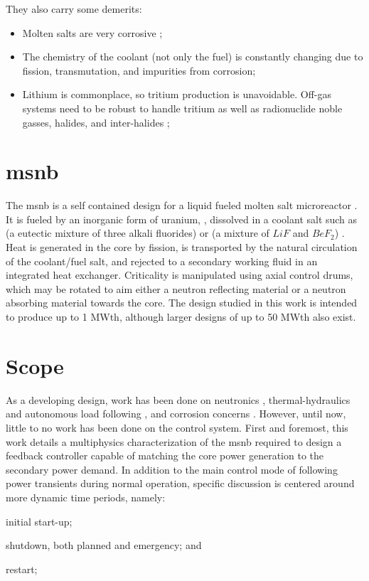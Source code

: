 They also carry some demerits:
\begin{itemize}
    \item Molten salts are very corrosive \cite{RoperRedox};
    \item The chemistry of the coolant (not only the fuel) is constantly changing due to fission, transmutation, and impurities from corrosion;
    \item Lithium is commonplace, so tritium production is unavoidable. Off-gas systems need to be robust to handle tritium as well as radionuclide noble gasses, halides, and inter-halides \cite{HolcombOffgas};
\end{itemize}

\section{\texorpdfstring{\acl{msnb}}{Molten Salt Nuclear Battery}}
The \acf{msnb} is a self contained design for a liquid fueled molten salt microreactor \cite{CarterPHD,PetersonMS}. It is fueled by an inorganic form of uranium, \UF, dissolved in a coolant salt such as \flinak (a eutectic mixture of three alkali fluorides) or \flibe  (a mixture of $LiF$ and $BeF_2$) \cite{RoperOverview}. Heat is generated in the core by fission, is transported by the natural circulation of the coolant/fuel salt, and rejected to a secondary working fluid in an integrated heat exchanger. Criticality is manipulated using axial control drums, which may be rotated to aim either a neutron reflecting material or a neutron absorbing material towards the core. The design studied in this work is intended to produce up to 1 MWth, although larger designs of up to 50 MWth also exist.


\section{Scope}
As a developing design, work has been done on neutronics \cite{PetersonMS}, thermal-hydraulics and autonomous load following \cite{CarterPHD}, and corrosion concerns \cite{RoperPHD}. However, until now, little to no work has been done on the control system. First and foremost, this work details a multiphysics characterization of the \acs{msnb} required to design a feedback controller capable of matching the core power generation to the secondary power demand. In addition to the main control mode of following power transients during normal operation, specific discussion is centered around more dynamic time periods, namely: 
\begin{enumerate*}[label=\arabic*)]
    \item initial start-up;
    \item shutdown, both planned and emergency; and
    \item restart;
\end{enumerate*}



